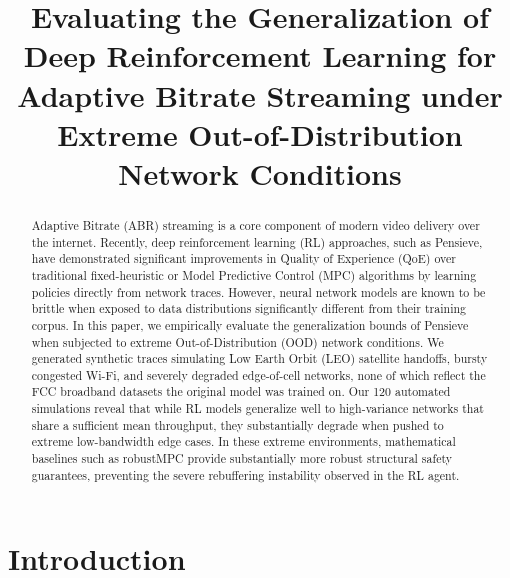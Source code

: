 \documentclass[10pt, conference, compsocconf]{IEEEtran}
\begin{document}
\title{Evaluating the Generalization of Deep Reinforcement Learning for Adaptive Bitrate Streaming under Extreme Out-of-Distribution Network Conditions}

\author{
}

\maketitle

\begin{abstract}
Adaptive Bitrate (ABR) streaming is a core component of modern video delivery over the internet. Recently, deep reinforcement learning (RL) approaches, such as Pensieve, have demonstrated significant improvements in Quality of Experience (QoE) over traditional fixed-heuristic or Model Predictive Control (MPC) algorithms by learning policies directly from network traces. However, neural network models are known to be brittle when exposed to data distributions significantly different from their training corpus. In this paper, we empirically evaluate the generalization bounds of Pensieve when subjected to extreme Out-of-Distribution (OOD) network conditions. We generated synthetic traces simulating Low Earth Orbit (LEO) satellite handoffs, bursty congested Wi-Fi, and severely degraded edge-of-cell networks, none of which reflect the FCC broadband datasets the original model was trained on. Our 120 automated simulations reveal that while RL models generalize well to high-variance networks that share a sufficient mean throughput, they substantially degrade when pushed to extreme low-bandwidth edge cases. In these extreme environments, mathematical baselines such as robustMPC provide substantially more robust structural safety guarantees, preventing the severe rebuffering instability observed in the RL agent.
\end{abstract}


\section{Introduction}
\end{document}

